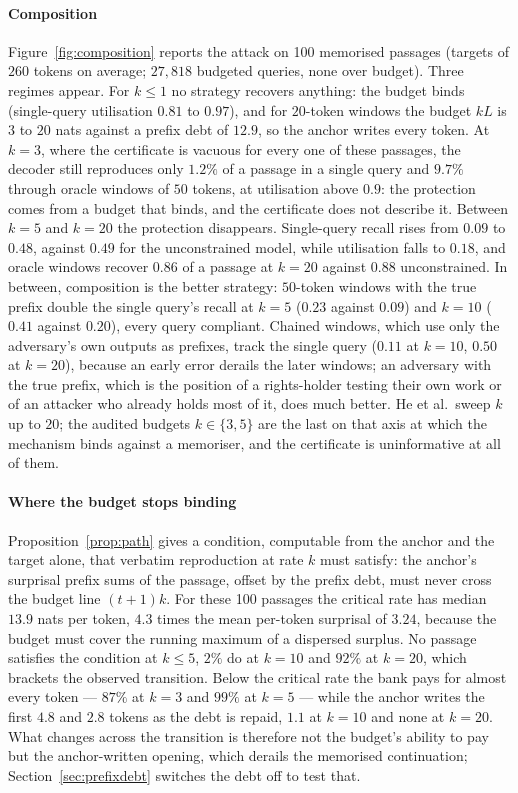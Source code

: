 \paragraph{Composition}
Figure~\ref{fig:composition} reports the attack on 100 memorised passages (targets of $260$ tokens on average; $27{,}818$ budgeted queries, none over budget). Three regimes appear. For $k \le 1$ no strategy recovers anything: the budget binds (single-query utilisation $0.81$ to $0.97$), and for $20$-token windows the budget $kL$ is $3$ to $20$ nats against a prefix debt of $12.9$, so the anchor writes every token. At $k=3$, where the certificate is vacuous for every one of these passages, the decoder still reproduces only $1.2\%$ of a passage in a single query and $9.7\%$ through oracle windows of $50$ tokens, at utilisation above $0.9$: the protection comes from a budget that binds, and the certificate does not describe it. Between $k=5$ and $k=20$ the protection disappears. Single-query recall rises from $0.09$ to $0.48$, against $0.49$ for the unconstrained model, while utilisation falls to $0.18$, and oracle windows recover $0.86$ of a passage at $k=20$ against $0.88$ unconstrained. In between, composition is the better strategy: $50$-token windows with the true prefix double the single query's recall at $k=5$ ($0.23$ against $0.09$) and $k=10$ ($0.41$ against $0.20$), every query compliant. Chained windows, which use only the adversary's own outputs as prefixes, track the single query ($0.11$ at $k=10$, $0.50$ at $k=20$), because an early error derails the later windows; an adversary with the true prefix, which is the position of a rights-holder testing their own work or of an attacker who already holds most of it, does much better. He et al.\ sweep $k$ up to $20$; the audited budgets $k \in \{3, 5\}$ are the last on that axis at which the mechanism binds against a memoriser, and the certificate is uninformative at all of them.

\paragraph{Where the budget stops binding}
Proposition~\ref{prop:path} gives a condition, computable from the anchor and the target alone, that verbatim reproduction at rate $k$ must satisfy: the anchor's surprisal prefix sums of the passage, offset by the prefix debt, must never cross the budget line $(t+1)k$. For these 100 passages the critical rate has median $13.9$ nats per token, $4.3$ times the mean per-token surprisal of $3.24$, because the budget must cover the running maximum of a dispersed surplus. No passage satisfies the condition at $k \le 5$, $2\%$ do at $k=10$ and $92\%$ at $k=20$, which brackets the observed transition. Below the critical rate the bank pays for almost every token --- $87\%$ at $k=3$ and $99\%$ at $k=5$ --- while the anchor writes the first $4.8$ and $2.8$ tokens as the debt is repaid, $1.1$ at $k=10$ and none at $k=20$. What changes across the transition is therefore not the budget's ability to pay but the anchor-written opening, which derails the memorised continuation; Section~\ref{sec:prefixdebt} switches the debt off to test that.
